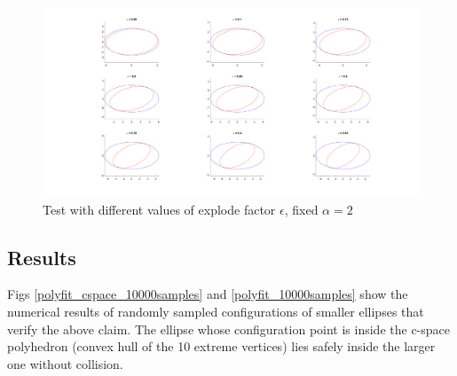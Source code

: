 \documentclass{article}
\begin{document}
\begin{figure}
\includegraphics[scale = 0.17]{fig/closed-form_maxAngle-test_epsilon.png}
\caption{Test with different values of explode factor $\epsilon$, fixed $\alpha = 2$}
\label{diff-epi}
\end{figure}

\subsection{Results}
Figs \ref{polyfit_cspace_10000samples} and \ref{polyfit_10000samples} show the numerical results of randomly sampled configurations of smaller ellipses that verify the above claim. The ellipse whose configuration point is inside the c-space polyhedron (convex hull of the 10 extreme vertices) lies safely inside the larger one without collision.
\end{document}
